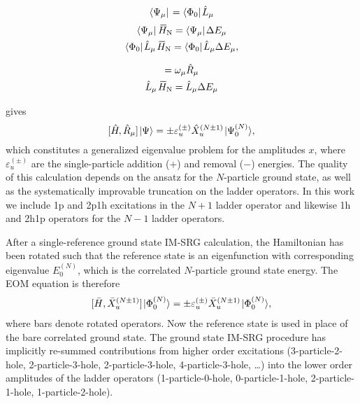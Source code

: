 \documentclass[thesis.tex]{subfiles}
\begin{document}
\begin{equation}\label{eq:ladder_def}
  \langle \Psi_{\mu} |\hspace{1pt} = \langle \Phi_{0} |\hspace{1pt}\hat{L}\hspace{-0.1pt}_{\mu}
\end{equation}
\begin{gather}
  \bra{\Psi_{\mu}}\EHamN = \bra{\Psi_{\mu}}\Ecorr_{\mu} \notag \\
  \refbra\Lop_{\mu}\EHamN = \refbra\Lop_{\mu}\Ecorr_{\mu},
\end{gather}


\begin{gather}
  [\EHamN,\Rop_{\mu}] = \omega_{\mu}\Rop_{\mu} \notag \\
  \Lop_{\mu}\EHamN = \Lop_{\mu}\Ecorr_{\mu}
\end{gather}


gives
\begin{equation}\label{eq:EOM}
  [\hat{H}\hspace{-1pt}, \hat{R}\hspace{-0.1pt}_{\mu}] \hspace{1pt}\lvert \Psi \rangle = \pm \varepsilon^{(\pm)}_u \hat{X}^{(N \pm 1)}_u \hspace{1pt}\lvert \Psi^{(N)}_0 \rangle,
\end{equation}
which constitutes a generalized eigenvalue problem for the amplitudes $x$, where $\varepsilon^{(\pm)}_u$ are the single-particle addition ($+$) and removal ($-$) energies. The quality of this calculation depends on the ansatz for the $N$-particle ground state, as well as the systematically improvable truncation on the ladder operators. In this work we include 1p and 2p1h excitations in the $N + 1$ ladder operator and likewise 1h and 2h1p operators for the $N - 1$ ladder operators.

After a single-reference ground state IM-SRG calculation, the Hamiltonian has been rotated such that the reference state is an eigenfunction with corresponding eigenvalue $E^{(N)}_0$, which is the correlated $N$-particle ground state energy. The EOM equation is therefore
\begin{align} \label{eq:EOMIMSRG}
  [\bar{H},\bar{X}^{(N \pm 1)}_u] \hspace{1pt}\lvert \Phi^{(N)}_0 \rangle = \pm \varepsilon^{(\pm)}_u \bar{X}^{(N \pm 1)}_u \hspace{1pt}\lvert \Phi^{(N)}_0 \rangle,
\end{align}
where bars denote rotated operators. Now the reference state is used in place of the bare correlated ground state. The ground state IM-SRG procedure has implicitly re-summed contributions from higher order excitations (3-particle-2-hole, 2-particle-3-hole, 2-particle-3-hole, 4-particle-3-hole, \ldots) into the lower order amplitudes of the ladder operators (1-particle-0-hole, 0-particle-1-hole, 2-particle-1-hole, 1-particle-2-hole).
\end{document}
